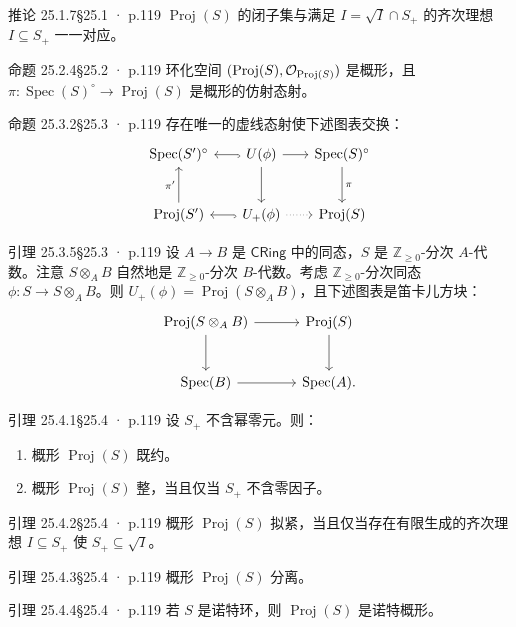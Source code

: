 \documentclass[UTF8,10pt,fontset=windows]{ctexart}
\newcommand{\Z}{\mathbb{Z}}\newcommand{\Q}{\mathbb{Q}}\newcommand{\R}{\mathbb{R}}
\newcommand{\Spec}{\operatorname{Spec}}\newcommand{\Spm}{\operatorname{Spm}}
\newcommand{\Proj}{\operatorname{Proj}}\newcommand{\Spv}{\operatorname{Spv}}
\newcommand{\CRing}{\mathsf{CRing}}\newcommand{\Ring}{\mathsf{Ring}}
\begin{document}
\begin{card}{推论 25.1.7}{§25.1 · p.119}
$\Proj(S)$ 的闭子集与满足 $I = \sqrt{I} \cap S_+$ 的齐次理想 $I \subseteq S_+$ 一一对应。
\end{card}
\begin{card}{命题 25.2.4}{§25.2 · p.119}
环化空间 $(\Proj(S), \cO_{\Proj(S)})$ 是概形，且 $\pi \colon \Spec(S)^{\circ} \to \Proj(S)$ 是概形的仿射态射。
\end{card}
\begin{card}{命题 25.3.2}{§25.3 · p.119}
存在唯一的虚线态射使下述图表交换：
\[
\begin{tikzcd}[column sep=1.6em, row sep=2.6em]
\Spec(S')^{\circ} & U(\phi) \arrow[l, hook] \arrow[r] \arrow[d] & \Spec(S)^{\circ} \arrow[d, "\pi"] \\
\Proj(S') \arrow[u, "\pi'"] & U_+(\phi) \arrow[l, hook] \arrow[r, dotted] & \Proj(S)
\end{tikzcd}
\]
\end{card}
\begin{card}{引理 25.3.5}{§25.3 · p.119}
设 $A \to B$ 是 $\CRing$ 中的同态，$S$ 是 $\Z_{\ge 0}$-分次 $A$-代数。注意 $S \otimes_A B$ 自然地是 $\Z_{\ge 0}$-分次 $B$-代数。考虑 $\Z_{\ge 0}$-分次同态 $\phi \colon S \to S \otimes_A B$。则 $U_+(\phi) = \Proj(S \otimes_A B)$，且下述图表是笛卡儿方块：
\[
\begin{tikzcd}[column sep=3em, row sep=2.6em]
\Proj(S \otimes_A B) \arrow[r] \arrow[d] & \Proj(S) \arrow[d] \\
\Spec(B) \arrow[r] & \Spec(A).
\end{tikzcd}
\]
\end{card}
\begin{card}{引理 25.4.1}{§25.4 · p.119}
设 $S_+$ 不含幂零元。则：
\begin{enumerate}[label=(\arabic*),leftmargin=2.4em,itemsep=0.25ex]
  \item 概形 $\Proj(S)$ 既约。
  \item 概形 $\Proj(S)$ 整，当且仅当 $S_+$ 不含零因子。
\end{enumerate}
\end{card}
\begin{card}{引理 25.4.2}{§25.4 · p.119}
概形 $\Proj(S)$ 拟紧，当且仅当存在有限生成的齐次理想 $I \subseteq S_+$ 使 $S_+ \subseteq \sqrt{I}$。
\end{card}
\begin{card}{引理 25.4.3}{§25.4 · p.119}
概形 $\Proj(S)$ 分离。
\end{card}
\begin{card}{引理 25.4.4}{§25.4 · p.119}
若 $S$ 是诺特环，则 $\Proj(S)$ 是诺特概形。
\end{card}
\end{document}
